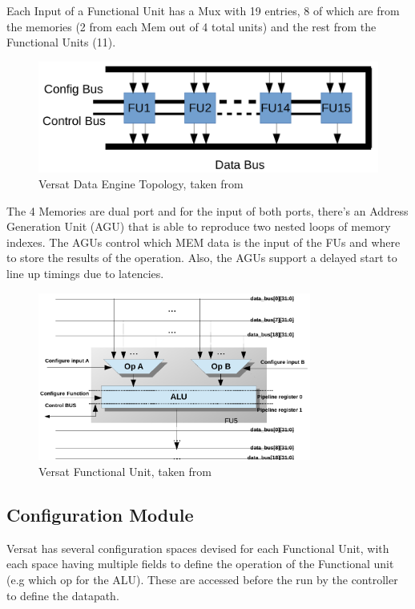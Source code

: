  Each Input of a Functional Unit has a Mux with 19 entries, 8 of which are from the memories (2 from each Mem out of 4 total units) and the rest from the Functional Units (11).

 \begin{figure}[!htbp]
    \centering
    \includegraphics[width=1\textwidth]{Figures/de.png}
    \caption{Versat Data Engine Topology, taken from~\cite{sousa:FFT}}
    \label{figure:DE}
\end{figure} 

 The 4 Memories are dual port and for the input of both ports, 
 there's an Address Generation Unit (AGU) that is able to 
 reproduce two nested loops of memory indexes.
 The AGUs control which MEM data is the input of the FUs and where
 to store the results of the operation. Also, the AGUs support a delayed start to line up timings
due to latencies.

\begin{figure}[!htbp]
    \centering
    \includegraphics[width=0.8\textwidth]{Figures/fu.pdf}
    \caption{Versat Functional Unit, taken from~\cite{lopes:versat}}
    \label{figure:FU}
\end{figure} 


\newpage
\subsection{Configuration Module}
Versat has several configuration spaces devised for each Functional Unit,
with each space having multiple fields to define the operation of the Functional unit (e.g which op for the ALU).
These are accessed before the run by the controller to define the datapath.

